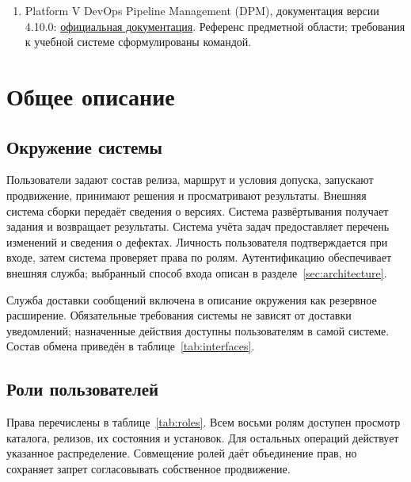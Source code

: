 \documentclass{tpks}
\begin{document}
\begin{enumerate}
\item Platform V DevOps Pipeline Management (DPM), документация версии 4.10.0:
\href{https://platformv.sbertech.ru/docs/public/DPM/4.10.0/common/index.html}{официальная документация}.
Референс предметной области; требования к учебной системе сформулированы командой.
\end{enumerate}

\section{Общее описание}
\subsection{Окружение системы}

Пользователи задают состав релиза, маршрут и условия допуска, запускают продвижение,
принимают решения и просматривают результаты. Внешняя система сборки передаёт сведения
о версиях. Система развёртывания получает задания и возвращает результаты.
Система учёта задач предоставляет перечень изменений и сведения о дефектах.
Личность пользователя подтверждается при входе, затем система проверяет права по ролям.
Аутентификацию обеспечивает внешняя служба; выбранный способ входа описан
в разделе~\ref{sec:architecture}.

Служба доставки сообщений включена в описание окружения
как резервное расширение. Обязательные требования системы не зависят от доставки
уведомлений; назначенные действия доступны пользователям в самой системе.
Состав обмена приведён в таблице~\ref{tab:interfaces}.

\subsection{Роли пользователей}\label{sec:roles}

Права перечислены в таблице~\ref{tab:roles}. Всем восьми ролям доступен просмотр
каталога, релизов, их состояния и установок. Для остальных операций действует
указанное распределение. Совмещение ролей даёт объединение прав, но сохраняет
запрет согласовывать собственное продвижение.
\end{document}
